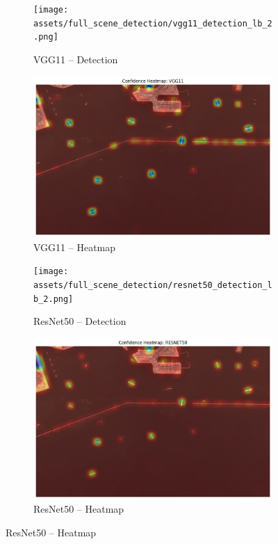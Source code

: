 \documentclass[11pt]{article}
\begin{document}
	\begin{figure}[H]
		\centering
		\caption{Full-Scene Ship Detections and Confidence Heatmaps}
		
		\begin{subfigure}[b]{0.49\textwidth}
			\centering
			\texttt{[image: assets/full\_scene\_detection/vgg11\_detection\_lb\_2.png]}
			\caption{VGG11 – Detection}
		\end{subfigure}
		\hfill
		\begin{subfigure}[b]{0.49\textwidth}
			\centering
			\includegraphics[width=\textwidth]{assets/confidence_heatmap/vgg11_confidence_heatmap.png}
			\caption{VGG11 – Heatmap}
		\end{subfigure}
		
		\begin{subfigure}[b]{0.49\textwidth}
			\centering
			\texttt{[image: assets/full\_scene\_detection/resnet50\_detection\_lb\_2.png]}
			\caption{ResNet50 – Detection}
		\end{subfigure}
		\hfill
		\begin{subfigure}[b]{0.49\textwidth}
			\centering
			\includegraphics[width=\textwidth]{assets/confidence_heatmap/resnet50_confidence_heatmap.png}
			\caption{ResNet50 – Heatmap}
		\end{subfigure}
		

\end{figure}
\end{document}
